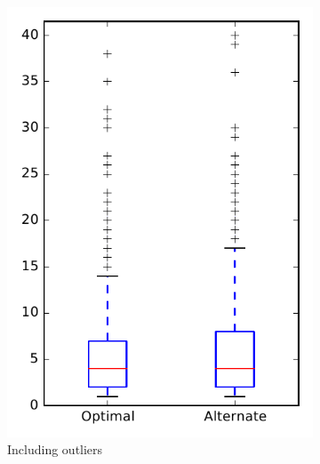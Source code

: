 
\begin{figure}
    \centering
    \begin{subfigure}{.4\textwidth}
        \centering
        \includegraphics[height=0.4\textheight]{figures/combo/dit_rq1_overview}
        \caption{Including outliers}\label{fig:combo:dit:rq1:overview_outlier}
    \end{subfigure}%
    \begin{subfigure}{.4\textwidth}
        \centering

\end{subfigure}
\end{figure}
